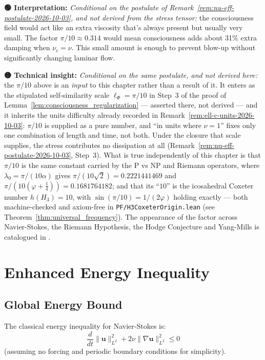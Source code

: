 \begin{greenbox}
\textbf{🟢 Interpretation:} \emph{Conditional on the postulate of
Remark~\ref{rem:nu-eff-postulate-2026-10-03}, and not derived from the stress
tensor:} the consciousness field would act like an extra viscosity that's always
present but usually very small. The factor $\pi/10 \approx 0.314$ would mean consciousness adds about 31\% extra damping when $\nu_c = \nu$. This small amount is enough to prevent blow-up without significantly changing laminar flow.

\textbf{🟡 Technical insight:} \emph{Conditional on the same postulate, and not
derived here:} the $\pi/10$ above is an \emph{input} to this chapter rather than
a result of it. It enters as the stipulated self-similarity scale
$\ell_{\Phi} = \pi/10$ in Step~3 of the proof of
Lemma~\ref{lem:consciousness_regularization} --- asserted there, not derived ---
and it inherits the units difficulty already recorded in
Remark~\ref{rem:ell-c-units-2026-10-03}: $\pi/10$ is supplied as a pure number,
and ``in units where $\nu = 1$'' fixes only one combination of length and time,
not both. Under the closure that scale supplies, the stress contributes no
dissipation at all (Remark~\ref{rem:nu-eff-postulate-2026-10-03}, Step~3). What
is true independently of this chapter is that $\pi/10$ is the same constant
carried by the P vs NP and Riemann operators, where $\lambda_0 = \pi/(10\alpha)$
gives $\pi/(10\sqrt{2}) = 0.2221441469$ and
$\pi/(10(\varphi + \tfrac14)) = 0.1681764182$; and that its ``$10$'' is the
icosahedral Coxeter number $h(H_3) = 10$, with $\sin(\pi/10) = 1/(2\varphi)$
holding exactly --- both machine-checked and axiom-free in
\texttt{PF/H3CoxeterOrigin.lean} (see
Theorem~\ref{thm:universal_frequency}). The appearance of the factor across
Navier-Stokes, the Riemann Hypothesis, the Hodge Conjecture and Yang-Mills is
catalogued in \cite{cohen2025spectralpi10}.
\end{greenbox}

\section{Enhanced Energy Inequality}

\subsection{Global Energy Bound}

The classical energy inequality for Navier-Stokes is:
\begin{equation}
\frac{d}{dt}\|\mathbf{u}\|_{L^2}^2 + 2\nu\|\nabla \mathbf{u}\|_{L^2}^2 \leq 0
\end{equation}
(assuming no forcing and periodic boundary conditions for simplicity).

